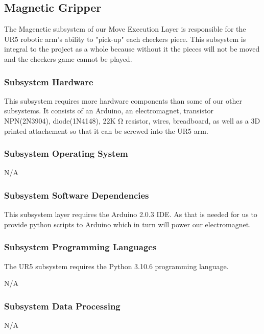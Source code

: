 \subsection{Magnetic Gripper}
The Magenetic subsystem of our Move Execution Layer is responsible for the UR5 robotic arm's ability to "pick-up" each checkers piece. This subsystem is integral to the project as a whole because without it the pieces will not be moved and the checkers game cannot be played.

\subsubsection{Subsystem Hardware}
This subsystem requires more hardware components than some of our other subsystems. It consists of an Arduino, an electromagnet, transistor NPN(2N3904), diode(1N4148), 22K Ω resistor, wires, breadboard, as well as a 3D printed attachement so that it can be screwed into the UR5 arm.

\subsubsection{Subsystem Operating System}
N/A

\subsubsection{Subsystem Software Dependencies}
This subsystem layer requires the Arduino 2.0.3 IDE. As that is needed for us to provide python scripts to Arduino which in turn will power our electromagnet.

\subsubsection{Subsystem Programming Languages}
The UR5 subsystem requires the Python 3.10.6 programming language.

N/A

\subsubsection{Subsystem Data Processing}
N/A